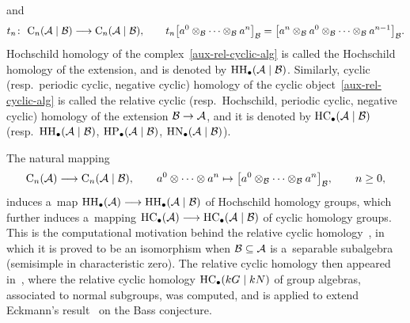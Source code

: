 and
\begin{gather*}%
t_n\colon \ {\rm C}_n({\cal A}\mid{\cal B}) \longrightarrow {\rm C}_n({\cal A}\mid{\cal B}),
\qquad
t_n\big[a^0 \otimes_{\cal B} \dots \otimes_{\cal B} a^n\big]_{\cal B} =\big[a^n \otimes_{\cal B} a^0
\otimes_{\cal B} \dots \otimes_{\cal B} a^{n-1}\big]_{\cal B}.
\end{gather*}
Hochschild homology of the complex~\eqref{aux-rel-cyclic-alg} is called the Hochschild homology of the extension, and is
denoted by ${\rm HH}_\bullet({\cal A}\mid{\cal B})$.
Similarly, cyclic (resp.\
periodic cyclic, negative cyclic) homology of the cyclic object~\eqref{aux-rel-cyclic-alg} is called the relative cyclic
(resp.\ Hochschild, periodic cyclic, negative cyclic) homology of the extension ${\cal B} \rightarrow{\cal A}$, and it is
denoted by ${\rm HC}_\bullet({\cal A}\mid{\cal B})$ (resp.\
${\rm HH}_\bullet({\cal A}\mid{\cal B})$, ${\rm HP}_\bullet({\cal A}\mid{\cal B})$, ${\rm HN}_\bullet({\cal A}\mid{\cal B})$).

The natural mapping
\begin{gather*}
{\rm C}_n({\cal A})\longrightarrow {\rm C}_n({\cal A}\mid{\cal B}),
\qquad
a^0\otimes\dots\otimes a^n\mapsto \big[a^0\otimes_{\cal B} \dots \otimes_{\cal B} a^n\big]_{{\cal B}},
\qquad
n\geq 0,
\end{gather*}
induces a~map ${\rm HH}_\bullet({\cal A})\longrightarrow {\rm HH}_\bullet({\cal A}\mid{\cal B})$ of Hochschild homology
groups, which further induces a~mapping ${\rm HC}_\bullet({\cal A})\longrightarrow {\rm HC}_\bullet({\cal A}\mid{\cal
B})$ of cyclic homology groups.
This is the computational motivation behind the relative cyclic homology~\cite{Kadi92}, in which it is proved to be an
isomorphism when ${\cal B}\subseteq {\cal A}$ is a~separable subalgebra (semisimple in characteristic zero).
The relative cyclic homology then appeared in~\cite{Scha92}, where the relative cyclic homology ${\rm HC}_\bullet(kG\mid kN)$
of group algebras, associated to normal subgroups, was computed, and is applied to extend Eckmann's
result~\cite{Eckm86} on the Bass conjecture.

